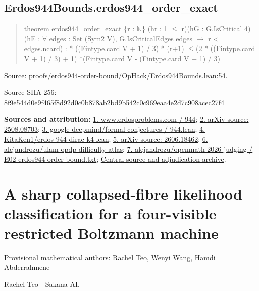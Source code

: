 \documentclass[11pt,a4paper]{article}
\begin{document}
\begin{samepage}
\subsection{Erdos944Bounds.erdos944\_order\_exact}
\begin{quote}\small\ttfamily theorem erdos944\_order\_exact \{r : \ensuremath{\mathbb{N}}\} (hr : 1 \ensuremath{\leq} r)\newline     (hG : G.IsCritical 4)\newline     (hE : \ensuremath{\forall} edges : Set (Sym2 V), G.IsCriticalEdges edges \ensuremath{\to} r < edges.ncard) : * ((Fintype.card V + 1) / 3) * (r+1) \ensuremath{\leq}\newline       (2 * ((Fintype.card V + 1) / 3) + 1) *\newline         (Fintype.card V - (Fintype.card V + 1) / 3)\end{quote}
{\small Source: proofs/erdos944-order-bound/OpHack/Erdos944Bounds.lean:54.\par}

{\small Source SHA-256: 8f9e544d0e9f465f8d92d0c0b878ab2bd9b542c0c969eaa4e2d7c908acec27f4\par}

{\small\textbf{Sources and attribution:} \href{https://www.erdosproblems.com/944}{1. www.erdosproblems.com / 944}; \href{https://arxiv.org/html/2508.08703}{2. arXiv source: 2508.08703}; \href{https://github.com/google-deepmind/formal-conjectures/blob/main/FormalConjectures/ErdosProblems/944.lean}{3. google-deepmind/formal-conjectures / 944.lean}; \href{https://github.com/KitaKen1/erdos-944-dirac-k4-lean}{4. KitaKen1/erdos-944-dirac-k4-lean}; \href{https://arxiv.org/abs/2606.18462}{5. arXiv source: 2606.18462}; \href{https://github.com/alejandrozu/ulam-opdp-difficulty-atlas}{6. alejandrozu/ulam-opdp-difficulty-atlas}; \href{https://github.com/alejandrozu/openmath-2026-judging/blob/d0ed487f487fa7ec814ff705ab55249983fe8707/OpenMath-Judging/review/entries/E02-erdos944-order-bound.txt}{7. alejandrozu/openmath-2026-judging / E02-erdos944-order-bound.txt}; \href{https://github.com/alejandrozu/openmath-2026-judging}{Central source and adjudication archive}.\par}

\end{samepage}
\clearpage
\section{A sharp collapsed-fibre likelihood classification for a four-visible restricted Boltzmann machine}
{\small Provisional mathematical authors: Rachel Teo, Wenyi Wang, Hamdi Abderrahmene\par}\medskip
{\small Rachel Teo  -  Sakana AI.\par}
\end{document}
